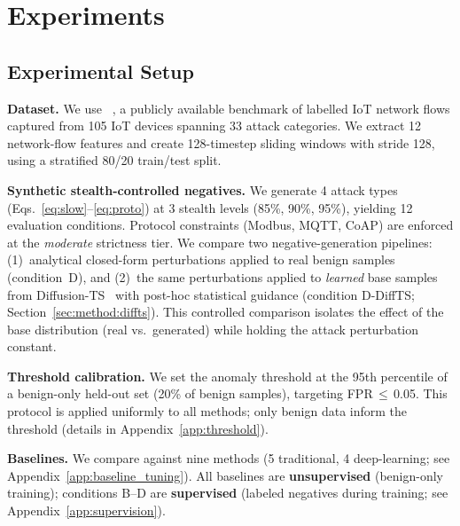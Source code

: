 \section{Experiments}
\label{sec:experiments}

\subsection{Experimental Setup}
\label{sec:experiments:setup}

\textbf{Dataset.}
We use \dataset{}~\cite{neto2023ciciot}, a publicly available benchmark
of labelled IoT network flows captured from 105 IoT devices spanning
33 attack categories.  We extract 12 network-flow features and create
128-timestep sliding windows with stride 128, using a stratified 80/20
train/test split.

\textbf{Synthetic stealth-controlled negatives.}
We generate 4 attack types (Eqs.~\ref{eq:slow}--\ref{eq:proto})
at 3 stealth levels (85\%, 90\%, 95\%), yielding 12 evaluation
conditions.  Protocol constraints (Modbus, MQTT, CoAP) are enforced
at the \emph{moderate} strictness tier.
We compare two negative-generation pipelines: (1)~analytical
closed-form perturbations applied to real benign samples (condition~D),
and (2)~the same perturbations applied to \emph{learned} base samples
from Diffusion-TS~\cite{zhang2024diffusionts} with post-hoc statistical
guidance (condition D-DiffTS; Section~\ref{sec:method:diffts}).
This controlled comparison isolates the effect of the base distribution
(real vs.\ generated) while holding the attack perturbation constant.

\textbf{Threshold calibration.}
We set the anomaly threshold at the 95th percentile of a benign-only
held-out set (20\% of benign samples), targeting FPR\,$\leq$\,0.05.
This protocol is applied uniformly to all methods; only benign data
inform the threshold (details in Appendix~\ref{app:threshold}).

\textbf{Baselines.}
We compare against nine methods (5 traditional, 4 deep-learning; see
Appendix~\ref{app:baseline_tuning}).
All baselines are \textbf{unsupervised} (benign-only training);
\ours{} conditions B--D are \textbf{supervised} (labeled negatives
during training; see Appendix~\ref{app:supervision}).

